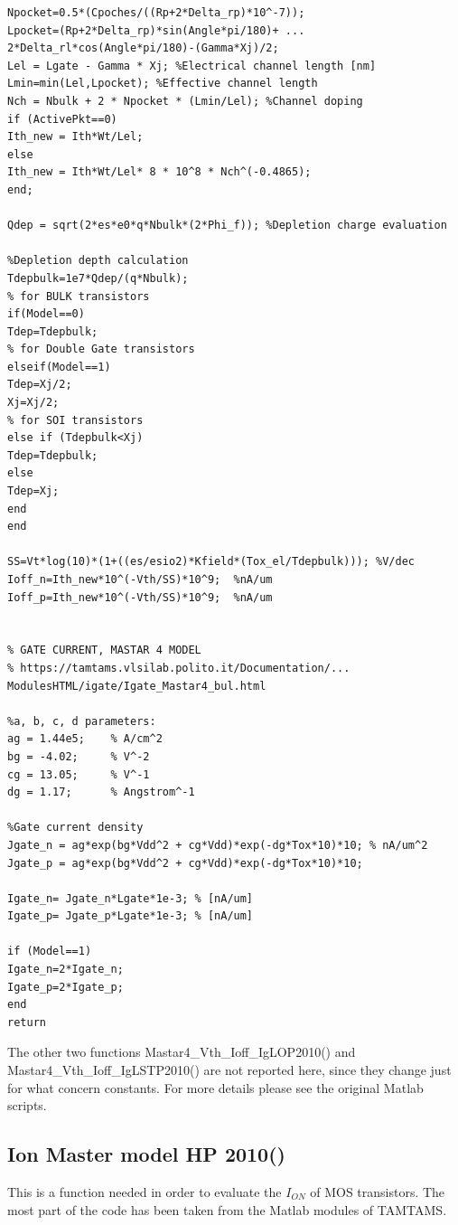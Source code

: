 \begin{lstlisting}
Npocket=0.5*(Cpoches/((Rp+2*Delta_rp)*10^-7)); 
Lpocket=(Rp+2*Delta_rp)*sin(Angle*pi/180)+ ...
2*Delta_rl*cos(Angle*pi/180)-(Gamma*Xj)/2;
Lel = Lgate - Gamma * Xj; %Electrical channel length [nm]
Lmin=min(Lel,Lpocket); %Effective channel length
Nch = Nbulk + 2 * Npocket * (Lmin/Lel); %Channel doping
if (ActivePkt==0)
Ith_new = Ith*Wt/Lel;
else
Ith_new = Ith*Wt/Lel* 8 * 10^8 * Nch^(-0.4865);
end;

Qdep = sqrt(2*es*e0*q*Nbulk*(2*Phi_f)); %Depletion charge evaluation

%Depletion depth calculation
Tdepbulk=1e7*Qdep/(q*Nbulk);
% for BULK transistors
if(Model==0)
Tdep=Tdepbulk;
% for Double Gate transistors
elseif(Model==1)
Tdep=Xj/2;
Xj=Xj/2;
% for SOI transistors
else if (Tdepbulk<Xj)
Tdep=Tdepbulk;
else
Tdep=Xj;
end
end

SS=Vt*log(10)*(1+((es/esio2)*Kfield*(Tox_el/Tdepbulk))); %V/dec
Ioff_n=Ith_new*10^(-Vth/SS)*10^9;  %nA/um
Ioff_p=Ith_new*10^(-Vth/SS)*10^9;  %nA/um


% GATE CURRENT, MASTAR 4 MODEL
% https://tamtams.vlsilab.polito.it/Documentation/...
ModulesHTML/igate/Igate_Mastar4_bul.html

%a, b, c, d parameters:
ag = 1.44e5;	% A/cm^2
bg = -4.02;		% V^-2
cg = 13.05;		% V^-1
dg = 1.17;		% Angstrom^-1

%Gate current density
Jgate_n = ag*exp(bg*Vdd^2 + cg*Vdd)*exp(-dg*Tox*10)*10;	% nA/um^2
Jgate_p = ag*exp(bg*Vdd^2 + cg*Vdd)*exp(-dg*Tox*10)*10;

Igate_n= Jgate_n*Lgate*1e-3; % [nA/um]
Igate_p= Jgate_p*Lgate*1e-3; % [nA/um]

if (Model==1)
Igate_n=2*Igate_n;
Igate_p=2*Igate_p;
end
return
\end{lstlisting}

The other two functions Mastar4\_Vth\_Ioff\_IgLOP2010() and Mastar4\_Vth\_Ioff\_IgLSTP2010() are not reported here, since they change just for what concern constants. For more details please see the original Matlab scripts.

\subsection{Ion Master model HP 2010()}
This is a function needed in order to evaluate the $I_{ON}$ of MOS transistors.
The most part of the code has been taken from the Matlab modules of TAMTAMS.

